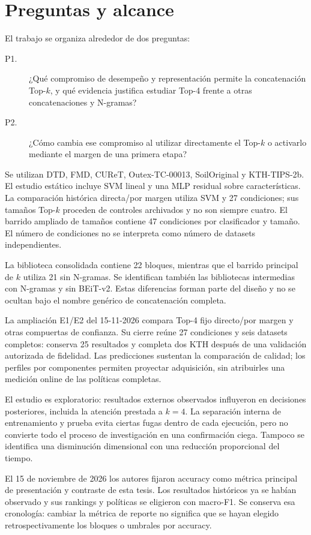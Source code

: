 \section{Preguntas y alcance}
El trabajo se organiza alrededor de dos preguntas:
\begin{description}
\item[P1.] ¿Qué compromiso de desempeño y representación permite la concatenación Top-\(k\), y qué evidencia justifica estudiar Top-4 frente a otras concatenaciones y N-gramas?
\item[P2.] ¿Cómo cambia ese compromiso al utilizar directamente el Top-\(k\) o activarlo mediante el margen de una primera etapa?
\end{description}

Se utilizan DTD, FMD, CUReT, Outex-TC-00013, SoilOriginal y KTH-TIPS-2b. El estudio estático incluye SVM lineal y una MLP residual sobre características. La comparación histórica directa/por margen utiliza SVM y 27 condiciones; sus tamaños Top-\(k\) proceden de controles archivados y no son siempre cuatro. El barrido ampliado de tamaños contiene 47 condiciones por clasificador y tamaño. El número de condiciones no se interpreta como número de datasets independientes.

La biblioteca consolidada contiene 22 bloques, mientras que el barrido principal de \(k\) utiliza 21 sin N-gramas. Se identifican también las bibliotecas intermedias con N-gramas y sin BEiT-v2. Estas diferencias forman parte del diseño y no se ocultan bajo el nombre genérico de concatenación completa.

La ampliación E1/E2 del 15-11-2026 compara Top-4 fijo directo/por margen y otras compuertas de confianza. Su cierre reúne 27 condiciones y seis datasets completos: conserva 25 resultados y completa dos KTH después de una validación autorizada de fidelidad. Las predicciones sustentan la comparación de calidad; los perfiles por componentes permiten proyectar adquisición, sin atribuirles una medición online de las políticas completas.

El estudio es exploratorio: resultados externos observados influyeron en decisiones posteriores, incluida la atención prestada a \(k=4\). La separación interna de entrenamiento y prueba evita ciertas fugas dentro de cada ejecución, pero no convierte todo el proceso de investigación en una confirmación ciega. Tampoco se identifica una disminución dimensional con una reducción proporcional del tiempo.

El 15 de noviembre de 2026 los autores fijaron accuracy como métrica principal de presentación y contraste de esta tesis. Los resultados históricos ya se habían observado y sus rankings y políticas se eligieron con macro-F1. Se conserva esa cronología: cambiar la métrica de reporte no significa que se hayan elegido retrospectivamente los bloques o umbrales por accuracy.

